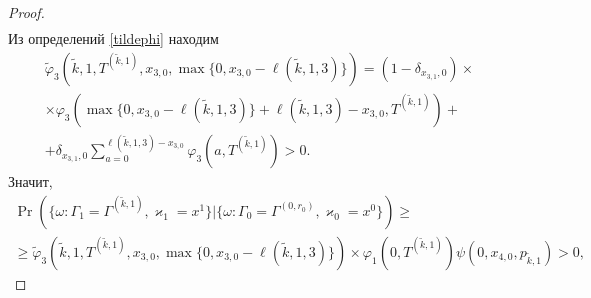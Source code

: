 \documentclass[a4paper,12pt,russian]{extarticle}
\begin{document}
\begin{proof}
\begin{align*}
\end{align*}
Из определений \eqref{tildephi} находим
\begin{multline*}
\widetilde{\varphi}_3(\tilde{k},1,T^{(\tilde{k},1)},x_{3,0},\max{\{0,x_{3,0} - \ell(\tilde{k},1,3)\}})= (1-\delta_{x_{3,1},0}) \times \\\times\varphi_3(\max{\{0,x_{3,0} - \ell(\tilde{k},1,3)\}} + \ell (\tilde{k},1,3) - x_{3,0},T^{(\tilde{k},1)} ) 
+\\+\delta_{x_{3,1},0} \sum_{a=0}^{\ell(\tilde{k},1,3)-x_{3,0}}\varphi_3 (a,T^{(\tilde{k},1)})>0.
\end{multline*}
Значит,
\begin{multline*}
\Pr(\{\omega\colon \Gamma_{1}=\Gamma^{(\tilde{k},1)}, \varkappa_{1}=x^1\}|\{\omega\colon 
\Gamma_{0}=\Gamma^{(0,r_0)}, \varkappa_{0}=x^0\})\geqslant \\
\geqslant \widetilde{\varphi}_3(\tilde{k},1,T^{(\tilde{k},1)},x_{3,0},\max{\{0,x_{3,0} - \ell(\tilde{k},1,3)\}})
\times
\varphi_1(0,T^{(\tilde{k},1)})  \psi(0,x_{4,0}, p_{\tilde{k},1}) > 0,
\end{multline*}


\end{proof}
\end{document}

